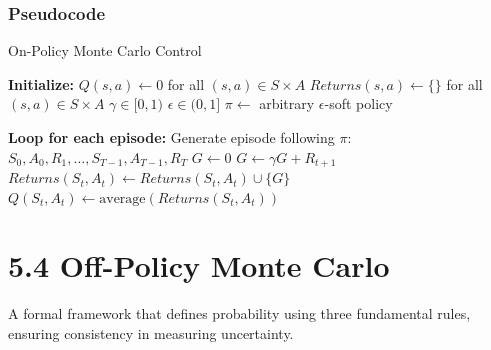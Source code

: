 \documentclass[
  letterpaper,
  DIV=11,
  numbers=noendperiod]{scrreprt}
\begin{document}
\subsection{Pseudocode}\label{pseudocode-7}

\begin{algorithm}[htb!]
\caption{On-Policy Monte Carlo Control}
\begin{algorithmic}[1]
\State \textbf{Initialize:} 
\State $Q(s, a) \gets 0$ for all $(s, a) \in S \times A$
\State $Returns(s, a) \gets \{\}$ for all $(s, a) \in S \times A$
\State $\gamma \in [0, 1)$
\State $\epsilon \in (0, 1]$
\State $\pi \gets$ arbitrary $\epsilon$-soft policy

\State \textbf{Loop for each episode:}
\State Generate episode following $\pi$: $S_{0}, A_{0}, R_{1}, \dots, S_{T-1}, A_{T-1}, R_{T}$
\State $G \gets 0$
    \State $G \gets \gamma G + R_{t+1}$
      
        \State $Returns(S_{t}, A_{t}) \gets Returns(S_{t}, A_{t}) \cup \{G\}$
        \State $Q(S_{t}, A_{t}) \gets \text{average}(Returns(S_{t}, A_{t}))$
    \Endif
\Endfor

\end{algorithmic}
\end{algorithm}

\chapter{5.4 Off-Policy Monte Carlo}\label{off-policy-monte-carlo}

\begin{tcolorbox}[enhanced jigsaw, colback=white, left=2mm, breakable, opacityback=0, bottomrule=.15mm, rightrule=.15mm, arc=.35mm, colframe=quarto-callout-note-color-frame, leftrule=.75mm, toprule=.15mm]

A formal framework that defines probability using three fundamental
rules, ensuring consistency in measuring uncertainty. 🎲

\end{tcolorbox}
\end{document}
